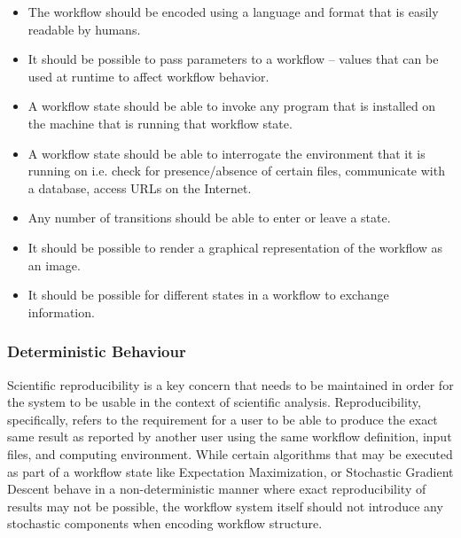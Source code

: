 \begin{itemize}
\item The workflow should be encoded using a language and format that is easily readable by humans.
\item It should be possible to pass parameters to a workflow -- values that can be used at runtime to affect workflow behavior.
\item A workflow state should be able to invoke any program that is installed on the machine that is running that workflow state.
\item A workflow state should be able to interrogate the environment that it is running on i.e. check for presence/absence of certain files, communicate with a database, access URLs on the Internet.
\item Any number of transitions should be able to enter or leave a state.
\item It should be possible to render a graphical representation of the workflow as an image.
\item It should be possible for different states in a workflow to exchange information.
\end{itemize}

\subsubsection{Deterministic Behaviour}
Scientific reproducibility is a key concern that needs to be maintained in order for the system to be usable in the context of scientific analysis. Reproducibility, specifically, refers to the requirement for a user to be able to produce the exact same result as reported by another user using the same workflow definition, input files, and computing environment. While certain algorithms that may be executed as part of a workflow state like Expectation Maximization\autocite{moon1996expectation}, or Stochastic Gradient Descent\autocite{bottou2010large} behave in a non-deterministic manner where exact reproducibility of results may not be possible, the workflow system itself should not introduce any stochastic components when encoding workflow structure.

